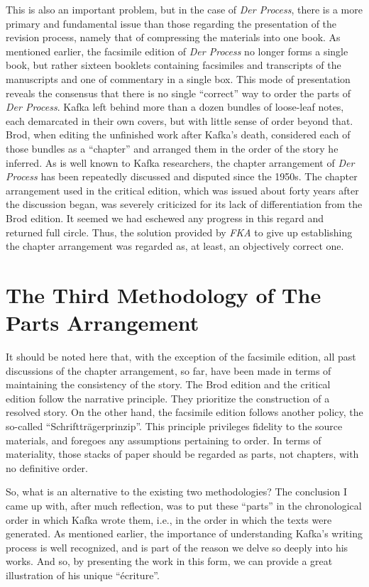 \begin{paper}
This is also an important problem, but in the case of \emph{Der
Process}, there is a more primary and fundamental issue than those
regarding the presentation of the revision process, namely that of
compressing the materials into one book. As mentioned earlier, the
facsimile edition of \emph{Der Process} no longer forms a single book,
but rather sixteen booklets containing facsimiles and transcripts of the
manuscripts and one of commentary in a single box. This mode of
presentation reveals the consensus that there is no single ``correct'' way
to order the parts of \emph{Der Process}. Kafka left behind more than a
dozen bundles of loose-leaf notes, each demarcated in their own covers,
but with little sense of order beyond that. Brod, when editing the
unfinished work after Kafka's death, considered each of those bundles as
a ``chapter'' and arranged them in the order of the story he inferred.
As is well known to Kafka researchers, the chapter arrangement of
\emph{Der Process} has been repeatedly discussed and disputed since the
1950s. The chapter arrangement used in the critical edition, which was
issued about forty years after the discussion began, was severely
criticized for its lack of differentiation from the Brod edition. It
seemed we had eschewed any progress in this regard and returned full
circle. Thus, the solution provided by \emph{FKA} to give up
establishing the chapter arrangement was regarded as, at least, an
objectively correct one.

\section{The Third Methodology of The Parts
Arrangement}\label{the-third-methodology-of-the-parts-arrangement}

It should be noted here that, with the exception of the facsimile
edition, all past discussions of the chapter arrangement, so far, have
been made in terms of maintaining the consistency of the story. The Brod
edition and the critical edition follow the narrative principle. They
prioritize the construction of a resolved story. On the other hand, the
facsimile edition follows another policy, the so-called
``Schriftträgerprinzip''. This principle privileges fidelity to the
source materials, and foregoes any assumptions pertaining to order. In
terms of materiality, those stacks of paper should be regarded as parts,
not chapters, with no definitive order.

So, what is an alternative to the existing two methodologies? The
conclusion I came up with, after much reflection, was to put these
``parts'' in the chronological order in which Kafka wrote them, i.e., in
the order in which the texts were generated. As mentioned earlier, the
importance of understanding Kafka's writing process is well recognized,
and is part of the reason we delve so deeply into his works. And so, by
presenting the work in this form, we can provide a great illustration
of his unique ``écriture''.


\end{paper}
